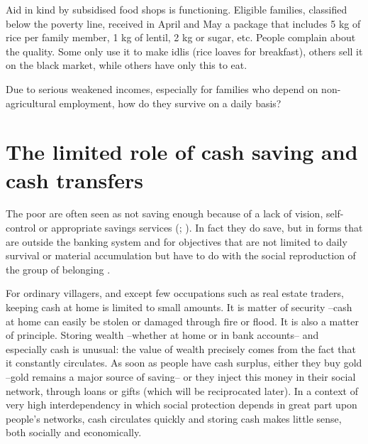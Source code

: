 \documentclass[a4paper, 11pt, onecolumn]{article}
\begin{document}
Aid in kind by subsidised food shops is functioning.
Eligible families, classified below the poverty line, received in April and May a package that includes 5 kg of rice per family member, 1 kg of lentil, 2 kg or sugar, etc. 
People complain about the quality.
Some only use it to make idlis (rice loaves for breakfast), others sell it on the black market, while others have only this to eat.

Due to serious weakened incomes, especially for families who depend on non-agricultural employment, how do they survive on a daily basis? 














\section{The limited role of cash saving and cash transfers}
\label{section:saving}

The poor are often seen as not saving enough because of a lack of vision, self-control or appropriate savings services (\citealp[pp. 183--204]{Banerjee2011}; \citealp{Karlan2014}).
In fact they do save, but in forms that are outside the banking system \citep{Collins2009, Rutherford2000, Peebles2014, Peebles2020, Goedecke2017, Guerin2019} and for objectives that are not limited to daily survival or material accumulation but have to do with the social reproduction of the group of belonging \citep{Peebles2014, Douglas1980}.

For ordinary villagers, and except few occupations such as real estate traders, keeping cash at home is limited to small amounts. 
It is matter of security --cash at home can easily be stolen or damaged through fire or flood. 
It is also a matter of principle. 
Storing wealth --whether at home or in bank accounts-- and especially cash is unusual: the value of wealth precisely comes from the fact that it constantly circulates. 
As soon as people have cash surplus, either they buy gold --gold remains a major source of saving-- or they inject this money in their social network, through loans or gifts (which will be reciprocated later). 
In a context of very high interdependency in which social protection depends in great part upon people's networks, cash circulates quickly and storing cash makes little sense, both socially and economically. 
\end{document}
